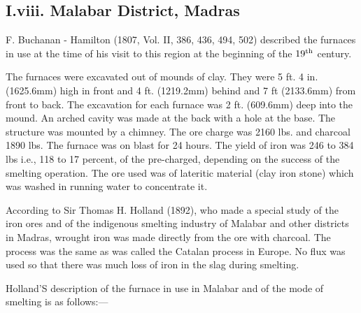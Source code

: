 \vspace{-.3cm}

\subsection*{I.viii.  Malabar District, Madras}\label{subsection-8}

\vspace{-.2cm}

F. Buchanan - Hamilton (1807, Vol. II, 386, 436, 494, 502) described the furnaces in use at the time of his visit to this region at the beginning of the $19^{\rm th}$ century.

The furnaces were excavated out of mounds of clay. They were 5 ft. 4 in. (1625.6mm) high in front and 4 ft. (1219.2mm) behind and 7 ft (2133.6mm) from front to back. The excavation for each furnace was 2 ft. (609.6mm) deep into the mound. An arched cavity was made at the back with a hole at the base. The structure was mounted by a chimney. The ore charge was 2160 lbs. and charcoal 1890 lbs. The furnace was on blast for 24 hours. The yield of iron was 246 to 384 lbs i.e., 118 to 17 percent, of the pre-charged, depending on the success of the smelting operation. The ore used was of lateritic material (clay iron stone) which was washed in running water to concentrate it. 

According to Sir Thomas H. Holland (1892), who made a special study of the iron ores and of the indigenous smelting industry of Malabar and other districts in Madras, wrought iron was made directly from the ore with charcoal. The process was the same as was called the Catalan process in Europe. No flux was used so that there was much loss of iron in the slag during smelting. 

Holland’S description of the furnace in use in Malabar and of the mode of smelting is as follows:— 

